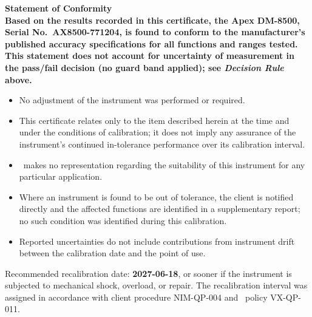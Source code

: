 
\begin{tcolorbox}[statementbox]
  \small\sffamily\bfseries\color{certnavy} Statement of Conformity\normalfont\normalsize\sffamily\color{black}\\[3pt]
  \small Based on the results recorded in this certificate, the Apex DM-8500,
  Serial No.\ AX8500-771204, is found to \textbf{conform} to the manufacturer's
  published accuracy specifications for all functions and ranges tested. This
  statement does not account for uncertainty of measurement in the pass/fail
  decision (no guard band applied); see \emph{Decision Rule} above.
\end{tcolorbox}

\vspace{6pt}
\begin{itemize}[leftmargin=1.4em,itemsep=2pt]
  \item No adjustment of the instrument was performed or required.
  \item This certificate relates only to the item described herein at the time and
        under the conditions of calibration; it does not imply any assurance of the
        instrument's continued in-tolerance performance over its calibration interval.
  \item \CertLabName\ makes no representation regarding the suitability of this
        instrument for any particular application.
  \item Where an instrument is found to be out of tolerance, the client is notified
        directly and the affected functions are identified in a supplementary report;
        no such condition was identified during this calibration.
  \item Reported uncertainties do not include contributions from instrument drift
        between the calibration date and the point of use.
\end{itemize}

\vspace{4pt}
{\small\color{certgray} Recommended recalibration date: \textbf{2027-06-18}, or sooner
if the instrument is subjected to mechanical shock, overload, or repair. The
recalibration interval was assigned in accordance with client procedure NIM-QP-004
and \CertLabName\ policy VX-QP-011.}
